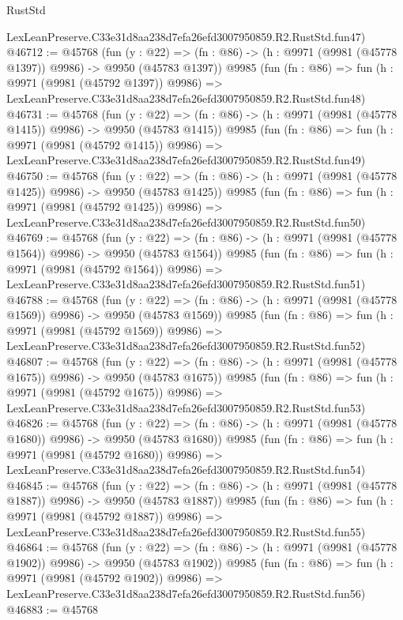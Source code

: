 \begin{lexlean}{RustStd}
\begin{coremodule}
    LexLeanPreserve.C33e31d8aa238d7efa26efd3007950859.R2.RustStd.fun47)
@46712 := @45768
    (fun (y : @22) =>
    (fn : @86) -> (h : @9971 (@9981 (@45778 @1397)) @9986) -> @9950 (@45783 @1397))
    @9985
    (fun (fn : @86) =>
    fun (h : @9971 (@9981 (@45792 @1397)) @9986) =>
    LexLeanPreserve.C33e31d8aa238d7efa26efd3007950859.R2.RustStd.fun48)
@46731 := @45768
    (fun (y : @22) =>
    (fn : @86) -> (h : @9971 (@9981 (@45778 @1415)) @9986) -> @9950 (@45783 @1415))
    @9985
    (fun (fn : @86) =>
    fun (h : @9971 (@9981 (@45792 @1415)) @9986) =>
    LexLeanPreserve.C33e31d8aa238d7efa26efd3007950859.R2.RustStd.fun49)
@46750 := @45768
    (fun (y : @22) =>
    (fn : @86) -> (h : @9971 (@9981 (@45778 @1425)) @9986) -> @9950 (@45783 @1425))
    @9985
    (fun (fn : @86) =>
    fun (h : @9971 (@9981 (@45792 @1425)) @9986) =>
    LexLeanPreserve.C33e31d8aa238d7efa26efd3007950859.R2.RustStd.fun50)
@46769 := @45768
    (fun (y : @22) =>
    (fn : @86) -> (h : @9971 (@9981 (@45778 @1564)) @9986) -> @9950 (@45783 @1564))
    @9985
    (fun (fn : @86) =>
    fun (h : @9971 (@9981 (@45792 @1564)) @9986) =>
    LexLeanPreserve.C33e31d8aa238d7efa26efd3007950859.R2.RustStd.fun51)
@46788 := @45768
    (fun (y : @22) =>
    (fn : @86) -> (h : @9971 (@9981 (@45778 @1569)) @9986) -> @9950 (@45783 @1569))
    @9985
    (fun (fn : @86) =>
    fun (h : @9971 (@9981 (@45792 @1569)) @9986) =>
    LexLeanPreserve.C33e31d8aa238d7efa26efd3007950859.R2.RustStd.fun52)
@46807 := @45768
    (fun (y : @22) =>
    (fn : @86) -> (h : @9971 (@9981 (@45778 @1675)) @9986) -> @9950 (@45783 @1675))
    @9985
    (fun (fn : @86) =>
    fun (h : @9971 (@9981 (@45792 @1675)) @9986) =>
    LexLeanPreserve.C33e31d8aa238d7efa26efd3007950859.R2.RustStd.fun53)
@46826 := @45768
    (fun (y : @22) =>
    (fn : @86) -> (h : @9971 (@9981 (@45778 @1680)) @9986) -> @9950 (@45783 @1680))
    @9985
    (fun (fn : @86) =>
    fun (h : @9971 (@9981 (@45792 @1680)) @9986) =>
    LexLeanPreserve.C33e31d8aa238d7efa26efd3007950859.R2.RustStd.fun54)
@46845 := @45768
    (fun (y : @22) =>
    (fn : @86) -> (h : @9971 (@9981 (@45778 @1887)) @9986) -> @9950 (@45783 @1887))
    @9985
    (fun (fn : @86) =>
    fun (h : @9971 (@9981 (@45792 @1887)) @9986) =>
    LexLeanPreserve.C33e31d8aa238d7efa26efd3007950859.R2.RustStd.fun55)
@46864 := @45768
    (fun (y : @22) =>
    (fn : @86) -> (h : @9971 (@9981 (@45778 @1902)) @9986) -> @9950 (@45783 @1902))
    @9985
    (fun (fn : @86) =>
    fun (h : @9971 (@9981 (@45792 @1902)) @9986) =>
    LexLeanPreserve.C33e31d8aa238d7efa26efd3007950859.R2.RustStd.fun56)
@46883 := @45768

\end{coremodule}
\end{lexlean}
